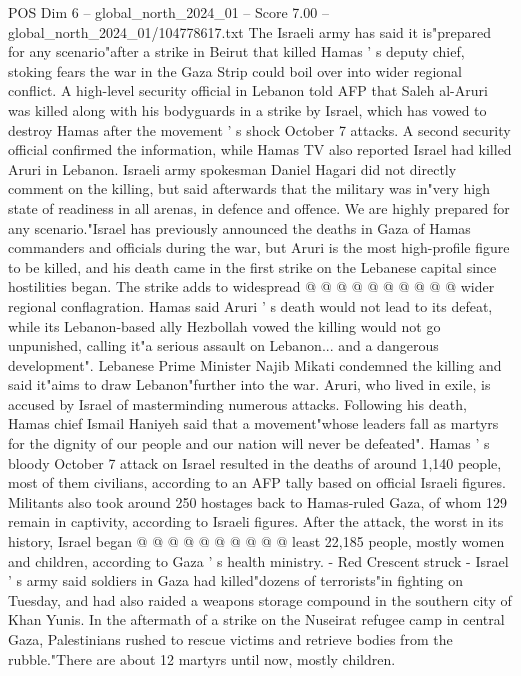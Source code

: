 \begin{textsample}{POS Dim 6 – global\_north\_2024\_01 – Score 7.00 – global\_north\_2024\_01/104778617.txt}  \label{ex:f6_pos_120}
The Israeli army has said it is"prepared for any scenario"after a strike in Beirut that killed Hamas ' s deputy chief, stoking fears the war in the Gaza Strip could boil over into wider regional conflict.
A high-level security official in Lebanon told AFP that Saleh al-Aruri was killed along with his bodyguards in a strike by Israel, which has vowed to destroy Hamas after the movement ' s shock October 7 attacks.
A second security official confirmed the information, while Hamas TV also reported Israel had killed Aruri in Lebanon.
Israeli army spokesman Daniel Hagari did not directly comment on the killing, but said afterwards that the military was in"very high state of readiness in all arenas, in defence and offence.
We are highly prepared for any scenario."Israel has previously announced the deaths in Gaza of Hamas commanders and officials during the war, but Aruri is the most high-profile figure to be killed, and his death came in the first strike on the Lebanese capital since hostilities began.
The strike adds to widespread @ @ @ @ @ @ @ @ @ @ wider regional conflagration.
Hamas said Aruri ' s death would not lead to its defeat, while its Lebanon-based ally Hezbollah vowed the killing would not go unpunished, calling it"a serious assault on Lebanon... and a dangerous development".
Lebanese Prime Minister Najib Mikati condemned the killing and said it"aims to draw Lebanon"further into the war.
Aruri, who lived in exile, is accused by Israel of masterminding numerous attacks.
Following his death, Hamas chief Ismail Haniyeh said that a movement"whose leaders fall as martyrs for the dignity of our people and our nation will never be defeated".
Hamas ' s bloody October 7 attack on Israel resulted in the deaths of around 1,140 people, most of them civilians, according to an AFP tally based on official Israeli figures.
Militants also took around 250 hostages back to Hamas-ruled Gaza, of whom 129 remain in captivity, according to Israeli figures.
After the attack, the worst in its history, Israel began @ @ @ @ @ @ @ @ @ @ least 22,185 people, mostly women and children, according to Gaza ' s health ministry. - Red Crescent struck - Israel ' s army said soldiers in Gaza had killed"dozens of terrorists"in fighting on Tuesday, and had also raided a weapons storage compound in the southern city of Khan Yunis.
In the aftermath of a strike on the Nuseirat refugee camp in central Gaza, Palestinians rushed to rescue victims and retrieve bodies from the rubble."There are about 12 martyrs until now, mostly children.

\end{textsample}
